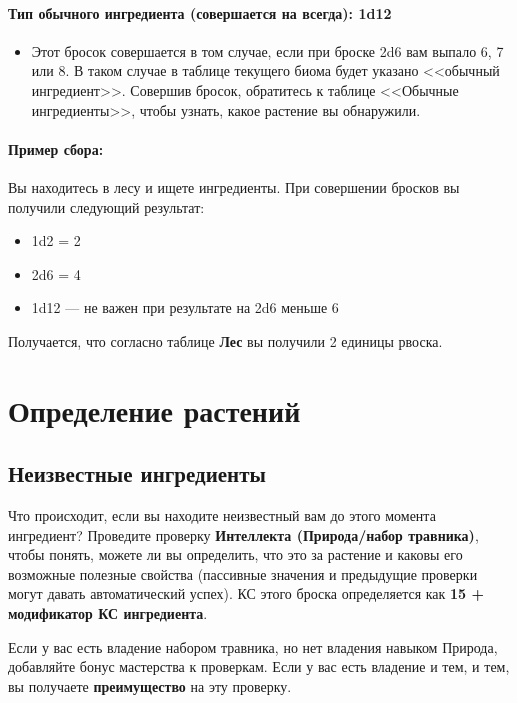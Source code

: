 \documentclass[a4paper, 9pt, twocolumn]{book}
\begin{document}
	\paragraph*{Тип обычного ингредиента (совершается на всегда): 1d12}
	
	\begin{itemize}
		\item Этот бросок совершается в том случае, если при броске 2d6 вам выпало 6, 7 или 8. В таком случае в таблице текущего биома будет указано <<обычный ингредиент>>. Совершив бросок, обратитесь к таблице <<Обычные ингредиенты>>, чтобы узнать, какое растение вы обнаружили.
	\end{itemize}
	
	\paragraph*{Пример сбора:}
	
	Вы находитесь в лесу и ищете ингредиенты. При совершении бросков вы получили следующий результат:
	
	\begin{itemize}
		\item 1d2 = 2
		\item 2d6 = 4
		\item 1d12 --- не важен при результате на 2d6 меньше 6
	\end{itemize}

	Получается, что согласно таблице \textbf{Лес} вы получили 2 единицы рвоска.
	
	\section{Определение растений}
	
	\subsection{Неизвестные ингредиенты}
	
	Что происходит, если вы находите неизвестный вам до этого момента ингредиент? Проведите проверку \textbf{Интеллекта (Природа/набор травника)}, чтобы понять, можете ли вы определить, что это за растение и каковы его возможные полезные свойства (пассивные значения и предыдущие проверки могут давать автоматический успех). КС этого броска определяется как \textbf{15 + модификатор КС ингредиента}.
	
	Если у вас есть владение набором травника, но нет владения навыком Природа, добавляйте бонус мастерства к проверкам. Если у вас есть владение и тем, и тем, вы получаете \textbf{преимущество} на эту проверку.
	
\end{document}
